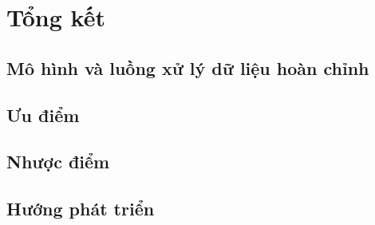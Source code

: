 \chapter{Tổng kết}
\section{Mô hình và luồng xử lý dữ liệu hoàn chỉnh}
\section{Ưu điểm}
\section{Nhược điểm}
\section{Hướng phát triển}



